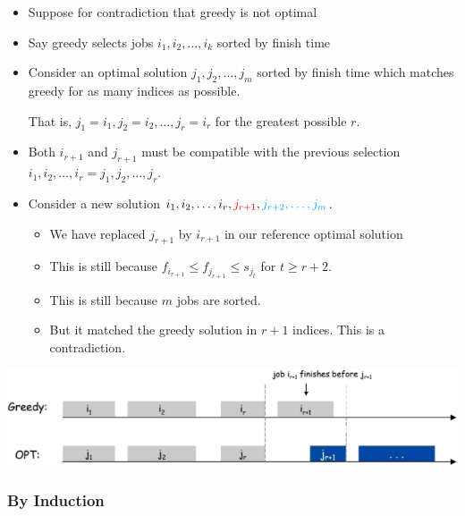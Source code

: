 \begin{itemize}
    \item Suppose for contradiction that greedy is not optimal

    \item Say greedy selects jobs $i_1, i_2, \dots, i_k$ sorted by finish time

    \item Consider an optimal solution $j_1, j_2, \dots, j_m$ sorted by finish time which matches greedy for as many indices as possible.

    That is, $j_1 = i_1, j_2 = i_2, \dots, j_r = i_r$ for the greatest possible $r$.

    \item Both $i_{r+1}$ and $j_{r+1}$ must be compatible with the previous selection $i_1, i_2, \dots, i_r = j_1, j_2, \dots, j_r$.

    \item Consider a new solution $i_1, i_2, \dots, i_r, {\color{red}j_{r+1}}, {\color{lightBlue}j_{r+2}, \dots, j_m}$.

    \begin{itemize}
        \item We have replaced $j_{r+1}$ by $i_{r+1}$ in our reference optimal solution
        \item This is still  because $f_{i_{r+1}} \le f_{j_{r+1}} \le s_{j_{t}}$ for $t \ge r+2$.
        \item This is still  because $m$ jobs are sorted.
        \item But it matched the greedy solution in $r + 1$ indices. This is a contradiction.
    \end{itemize}
\end{itemize}

\begin{center}
    \includegraphics[width=0.67\linewidth]{figures/interval-scheduling-contradiction.png}
\end{center}

\subsubsection{By Induction}

